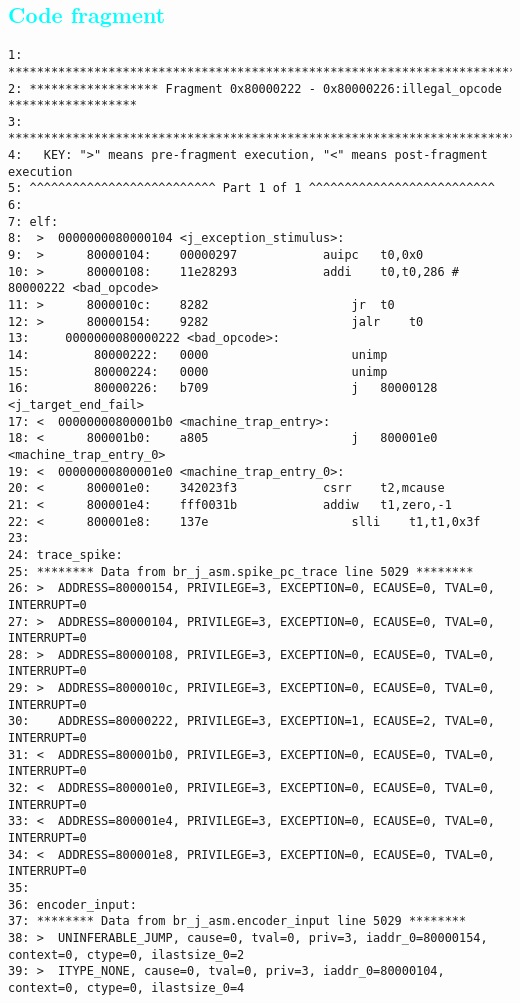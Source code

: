 \textcolor{cyan}{\subsection{Code fragment}}
\begin {lstlisting}[basicstyle=\tiny]
1: *************************************************************************************
2: ****************** Fragment 0x80000222 - 0x80000226:illegal_opcode ******************
3: *************************************************************************************
4:   KEY: ">" means pre-fragment execution, "<" means post-fragment execution
5: ^^^^^^^^^^^^^^^^^^^^^^^^^^ Part 1 of 1 ^^^^^^^^^^^^^^^^^^^^^^^^^^
6:
7: elf:
8:  >  0000000080000104 <j_exception_stimulus>:
9:  >      80000104:	00000297          	auipc	t0,0x0
10: >      80000108:	11e28293          	addi	t0,t0,286 # 80000222 <bad_opcode>
11: >      8000010c:	8282                	jr	t0
12: >      80000154:	9282                	jalr	t0
13:     0000000080000222 <bad_opcode>:
14:         80000222:	0000                	unimp
15:         80000224:	0000                	unimp
16:         80000226:	b709                	j	80000128 <j_target_end_fail>
17: <  00000000800001b0 <machine_trap_entry>:
18: <      800001b0:	a805                	j	800001e0 <machine_trap_entry_0>
19: <  00000000800001e0 <machine_trap_entry_0>:
20: <      800001e0:	342023f3          	csrr	t2,mcause
21: <      800001e4:	fff0031b          	addiw	t1,zero,-1
22: <      800001e8:	137e                	slli	t1,t1,0x3f
23:
24: trace_spike:
25: ******** Data from br_j_asm.spike_pc_trace line 5029 ********
26: >  ADDRESS=80000154, PRIVILEGE=3, EXCEPTION=0, ECAUSE=0, TVAL=0, INTERRUPT=0
27: >  ADDRESS=80000104, PRIVILEGE=3, EXCEPTION=0, ECAUSE=0, TVAL=0, INTERRUPT=0
28: >  ADDRESS=80000108, PRIVILEGE=3, EXCEPTION=0, ECAUSE=0, TVAL=0, INTERRUPT=0
29: >  ADDRESS=8000010c, PRIVILEGE=3, EXCEPTION=0, ECAUSE=0, TVAL=0, INTERRUPT=0
30:    ADDRESS=80000222, PRIVILEGE=3, EXCEPTION=1, ECAUSE=2, TVAL=0, INTERRUPT=0
31: <  ADDRESS=800001b0, PRIVILEGE=3, EXCEPTION=0, ECAUSE=0, TVAL=0, INTERRUPT=0
32: <  ADDRESS=800001e0, PRIVILEGE=3, EXCEPTION=0, ECAUSE=0, TVAL=0, INTERRUPT=0
33: <  ADDRESS=800001e4, PRIVILEGE=3, EXCEPTION=0, ECAUSE=0, TVAL=0, INTERRUPT=0
34: <  ADDRESS=800001e8, PRIVILEGE=3, EXCEPTION=0, ECAUSE=0, TVAL=0, INTERRUPT=0
35:
36: encoder_input:
37: ******** Data from br_j_asm.encoder_input line 5029 ********
38: >  UNINFERABLE_JUMP, cause=0, tval=0, priv=3, iaddr_0=80000154, context=0, ctype=0, ilastsize_0=2
39: >  ITYPE_NONE, cause=0, tval=0, priv=3, iaddr_0=80000104, context=0, ctype=0, ilastsize_0=4

\end{lstlisting}
